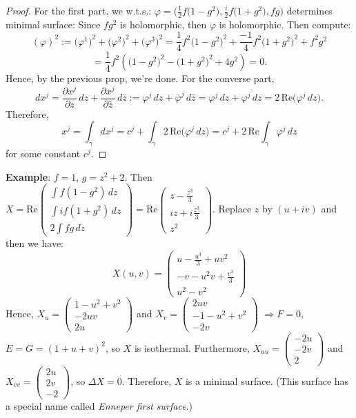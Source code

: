 \begin{proof}
For the first part, we w.t.s.: $\varphi = \Big(\frac{1}{2}f\big(1 - g^2\big), \frac{i}{2}f\big(1 + g^2\big), fg\Big)$ determines minimal surface:
Since $fg^2$ is holomorphic, then $\varphi$ is holomorphic. Then compute:
\[
(\varphi)^2 := \big(\varphi^1\big)^2 + \big(\varphi^2\big)^2 + \big(\varphi^3\big)^2 = \frac{1}{4}f^2\big(1 - g^2\big)^2 + \frac{-1}{4}f^2\big(1 + g^2\big)^2 + f^2g^2
\]
\[
= \frac{1}{4}f^2\left(\big(1 - g^2\big)^2 - \big(1 + g^2\big)^2 + 4g^2\right) = 0.
\]
Hence, by the previous prop, we're done. For the converse part,
\[
dx^j = \frac{\partial x^j}{\partial z}\,dz + \frac{\partial x^j}{\partial\bar{z}}\,d\bar{z} := \varphi^j\,dz + \overline{\varphi}^j\,d\bar{z} = \varphi^j\,dz + \overline{\varphi^j\,dz} = 2\,\mathrm{Re}\big(\varphi^j\,dz\big).
\]
Therefore,
\[
x^j = \int_\gamma dx^j = c^j + \int_\gamma 2\,\mathrm{Re}\big(\varphi^j\,dz\big) = c^j + 2\,\mathrm{Re}\int_\gamma\varphi^j\,dz
\]
for some constant $c^j$.
\end{proof}

\noindent\textbf{Example}: $f = 1$, $g = z^2 + 2$. Then $X = \mathrm{Re}\begin{pmatrix}\int f(1 - g^2)\,dz\\ \int if(1 + g^2)\,dz\\ 2\int fg\,dz\end{pmatrix} = \mathrm{Re}\begin{pmatrix}z - \frac{z^3}{3}\\ iz + i\frac{z^3}{3}\\ z^2\end{pmatrix}$. Replace $z$ by $(u + iv)$ and then we have:
\[
X(u, v) = \begin{pmatrix}
u - \frac{u^3}{3} + uv^2\\[1mm]
-v - u^2v + \frac{v^3}{3}\\[1mm]
u^2 - v^2
\end{pmatrix}
\]
Hence, $X_u = \begin{pmatrix}1 - u^2 + v^2\\ -2uv\\ 2u\end{pmatrix}$ and $X_v = \begin{pmatrix}2uv\\ -1 - u^2 + v^2\\ -2v\end{pmatrix}$ $\Rightarrow F = 0$, $E = G = (1 + u + v)^2$, so $X$ is isothermal. Furthermore, $X_{uu} = \begin{pmatrix}-2u\\ -2v\\ 2\end{pmatrix}$ and $X_{vv} = \begin{pmatrix}2u\\ 2v\\ -2\end{pmatrix}$, so $\Delta X = 0$. Therefore, $X$ is a minimal surface. (This surface has a special name called \textit{Enneper first surface}.)


